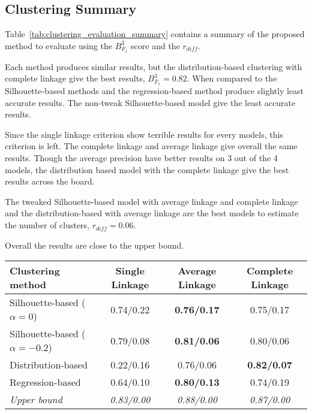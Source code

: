 \subsection{Clustering Summary}

Table~\ref{tab:clustering_evaluation_summary} contains a summary of the proposed method to evaluate using the $B^3_{F_1}$ score and the $r_{diff}$.

Each method produces similar results, but the distribution-based clustering with complete linkage give the best results, $B^3_{F_1} = 0.82$.
When compared to the Silhouette-based methods and the regression-based method produce slightly least accurate results.
The non-tweak Silhouette-based model give the least accurate results.

Since the single linkage criterion show terrible results for every models, this criterion is left.
The complete linkage and average linkage give overall the same results.
Though the average precision have better results on 3 out of the 4 models, the distribution based model with the complete linkage give the best results across the board.

The tweaked Silhouette-based model with average linkage and complete linkage and the distribution-based with average linkage are the best models to estimate the number of clusters, $r_{diff} = 0.06$.

Overall the results are close to the upper bound.

\begin{table*}[t]
  \centering
  \caption{Mean retained rank lists $B^{3}_{F_1}$/$r_{diff}$ for each corpus pair}
  \label{tab:clustering_evaluation_summary}
  \begin{tabular}{l c c c}
    \toprule
    Clustering method                  & Single Linkage & Average Linkage    & Complete Linkage \\
    \midrule
    Silhouette-based ($\alpha = 0$)    & 0.74/0.22      & \textbf{0.76/0.17} & 0.75/0.17 \\
    Silhouette-based ($\alpha = -0.2$) & 0.79/0.08      & \textbf{0.81/0.06} & 0.80/0.06 \\
    Distribution-based                 & 0.22/0.16      & 0.76/0.06          & \textbf{0.82/0.07} \\
    Regression-based                   & 0.64/0.10      & \textbf{0.80/0.13} & 0.74/0.19 \\
    \midrule
    \textit{Upper bound}           & \textit{0.83/0.00} & \textit{0.88/0.00} & \textit{0.87/0.00} \\
    \bottomrule
  \end{tabular}
\end{table*}
